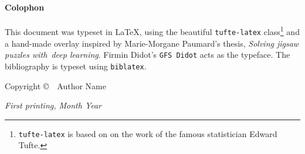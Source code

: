 \newpage
\begin{fullwidth}
~\vfill
\thispagestyle{empty}
\setlength{\parindent}{0pt}
\setlength{\parskip}{\baselineskip}
\end{fullwidth}

\paragraph{Colophon}

This document was typeset in \LaTeX, using the beautiful \texttt{tufte-latex} class\footnote[][112ex]{\texttt{tufte-latex} is based on on the work of the famous statistician Edward Tufte.} and a hand-made overlay inspired by Marie-Morgane Paumard's thesis, \textit{Solving jigsaw puzzles with~deep learning}. Firmin Didot's \texttt{GFS Didot} acts as the typeface. The bibliography is typeset using \texttt{biblatex}.


\newthought{}Copyright \copyright\ \the\year\ Author Name

\newthought{}\textit{First printing, Month Year}
